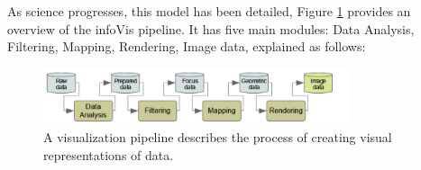 \bigbreak
As science progresses, this model has been detailed, Figure \ref{fig:infovispipeline} provides an overview of the infoVis pipeline. It has five main modules: Data Analysis, Filtering, Mapping, Rendering, Image data, explained as follows:


\begin{figure}[h!]
  \center
  \includegraphics[width=0.80\textwidth]{images/chapter2/infoVispipeline.PNG}
  \caption{A visualization pipeline describes the process of creating visual representations of data.}
  \label{fig:infovispipeline}
\end{figure}


